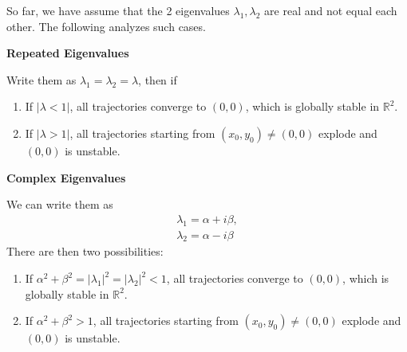 \documentclass[11pt,a4paper]{book}
\theoremstyle{definition}\newtheorem{definition}{Definition}
\theoremstyle{definition}\newtheorem{fact}{Fact}
\theoremstyle{definition}\newtheorem{remark}{Remark}
\theoremstyle{definition}\newtheorem{ex}{Ex.}
\theoremstyle{definition}\newtheorem{project}{Project}
\theoremstyle{definition}\newtheorem{problem}{Problem}
\theoremstyle{definition}\newtheorem{example}{Example}
\numberwithin{theorem}{section}
\numberwithin{corollary}{chapter}
\numberwithin{assumption}{chapter}
\numberwithin{definition}{chapter}
\numberwithin{prop}{chapter}
\numberwithin{notation}{chapter}
\numberwithin{problem}{chapter}
\numberwithin{example}{chapter}
\numberwithin{fact}{chapter}
\numberwithin{ex}{chapter}
\def\R{\mathbb R}
\def\R{\mathbb R}
\begin{document}
	So far, we have assume that the 2 eigenvalues $\lambda_1, \lambda_2$ are real and not equal each other. The following analyzes such cases.
	
	\textbf{Repeated Eigenvalues}
	
	Write them as $\lambda_1 = \lambda_2 = \lambda$, then if
	\begin{enumerate}
		\item If $|\lambda < 1|$, all trajectories converge to $(0, 0)$, which is globally stable in $\R^2$.
		\item If $|\lambda > 1|$, all trajectories starting from $(x_0, y_0) \neq (0, 0)$ explode and $(0, 0)$ is unstable.
	\end{enumerate}
	
	\textbf{Complex Eigenvalues}
	
	We can write them as
	\begin{align*}
		\lambda_1 = \alpha + i \beta, \\
		\lambda_2 = \alpha - i \beta
	\end{align*}
	There are then two possibilities:
	\begin{enumerate}
		\item If $ \alpha^2 + \beta^2 = |\lambda_1|^2 = |\lambda_2|^2 < 1$, all trajectories converge to $(0, 0)$, which is globally stable in $\R^2$.
		\item If $ \alpha^2 + \beta^2 > 1$, all trajectories starting from $(x_0, y_0) \neq (0, 0)$ explode and $(0, 0)$ is unstable.
	\end{enumerate}
	
\end{document}
